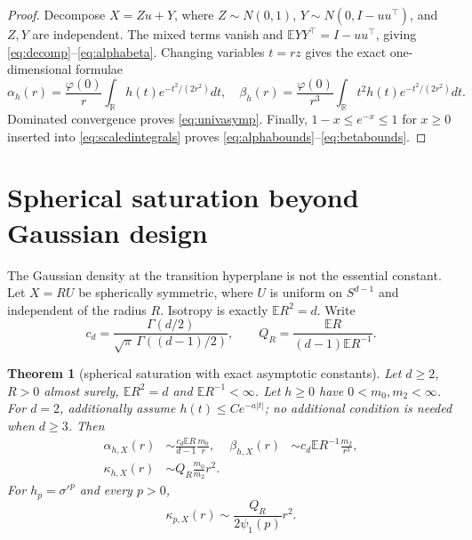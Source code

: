 \documentclass[11pt]{article}
\newtheorem{theorem}{Theorem}[section]
\newcommand{\E}{\mathbb E}
\newcommand{\R}{\mathbb R}
\begin{document}
\begin{proof}
Decompose $X=Zu+Y$, where $Z\sim N(0,1)$, $Y\sim N(0,I-uu^\top)$, and $Z,Y$ are independent.
The mixed terms vanish and $\E YY^\top=I-uu^\top$, giving \eqref{eq:decomp}--\eqref{eq:alphabeta}.
Changing variables $t=rz$ gives the exact one-dimensional formulae
\begin{equation}
 \alpha_h(r)=\frac{\varphi(0)}r\int_\R h(t)e^{-t^2/(2r^2)}dt,
 \quad
 \beta_h(r)=\frac{\varphi(0)}{r^3}\int_\R t^2h(t)e^{-t^2/(2r^2)}dt.
 \label{eq:scaledintegrals}
\end{equation}
Dominated convergence proves \eqref{eq:univasymp}.  Finally,
$1-x\le e^{-x}\le1$ for $x\ge0$ inserted into \eqref{eq:scaledintegrals} proves
\eqref{eq:alphabounds}--\eqref{eq:betabounds}.
\end{proof}

\section{Spherical saturation beyond Gaussian design}
\label{sec:global-spherical}

The Gaussian density at the transition hyperplane is not the essential constant.  Let $X=RU$ be spherically
symmetric, where $U$ is uniform on $S^{d-1}$ and independent of the radius $R$.  Isotropy is exactly
$\E R^2=d$.  Write
\[
 c_d=\frac{\Gamma(d/2)}{\sqrt\pi\,\Gamma((d-1)/2)},\qquad
 Q_R=\frac{\E R}{(d-1)\E R^{-1}}.
\]

\begin{theorem}[spherical saturation with exact asymptotic constants]
\label{thm:globalspherical}
Let $d\ge2$, $R>0$ almost surely, $\E R^2=d$ and $\E R^{-1}<\infty$.  Let $h\ge0$ have
$0<m_0,m_2<\infty$.  For $d=2$, additionally assume $h(t)\le Ce^{-a|t|}$; no additional condition is needed
when $d\ge3$.  Then
\begin{align}
 \alpha_{h,X}(r)&\sim \frac{c_d\E R}{d-1}\frac{m_0}{r},&
 \beta_{h,X}(r)&\sim c_d\E R^{-1}\frac{m_2}{r^3},\label{eq:sphericalasymp}\\
 \kappa_{h,X}(r)&\sim Q_R\frac{m_0}{m_2}r^2.\label{eq:sphericalkappa}
\end{align}
For $h_p=\sigma'^p$ and every $p>0$,
\begin{equation}
 \kappa_{p,X}(r)\sim\frac{Q_R}{2\psi_1(p)}r^2.
 \label{eq:sphericallogistic}
\end{equation}
\end{theorem}
\end{document}
